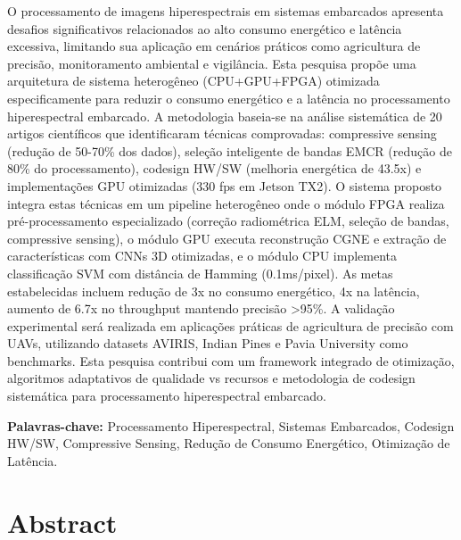 \documentclass[12pt,oneside,a4paper,english,brazilian]{report}
\begin{document}
O processamento de imagens hiperespectrais em sistemas embarcados apresenta desafios significativos relacionados ao alto consumo energético e latência excessiva, limitando sua aplicação em cenários práticos como agricultura de precisão, monitoramento ambiental e vigilância. Esta pesquisa propõe uma arquitetura de sistema heterogêneo (CPU+GPU+FPGA) otimizada especificamente para reduzir o consumo energético e a latência no processamento hiperespectral embarcado. A metodologia baseia-se na análise sistemática de 20 artigos científicos que identificaram técnicas comprovadas: compressive sensing (redução de 50-70\% dos dados), seleção inteligente de bandas EMCR (redução de 80\% do processamento), codesign HW/SW (melhoria energética de 43.5x) e implementações GPU otimizadas (330 fps em Jetson TX2). O sistema proposto integra estas técnicas em um pipeline heterogêneo onde o módulo FPGA realiza pré-processamento especializado (correção radiométrica ELM, seleção de bandas, compressive sensing), o módulo GPU executa reconstrução CGNE e extração de características com CNNs 3D otimizadas, e o módulo CPU implementa classificação SVM com distância de Hamming (0.1ms/pixel). As metas estabelecidas incluem redução de 3x no consumo energético, 4x na latência, aumento de 6.7x no throughput mantendo precisão >95\%. A validação experimental será realizada em aplicações práticas de agricultura de precisão com UAVs, utilizando datasets AVIRIS, Indian Pines e Pavia University como benchmarks. Esta pesquisa contribui com um framework integrado de otimização, algoritmos adaptativos de qualidade vs recursos e metodologia de codesign sistemática para processamento hiperespectral embarcado.

\textbf{Palavras-chave:} Processamento Hiperespectral, Sistemas Embarcados, Codesign HW/SW, Compressive Sensing, Redução de Consumo Energético, Otimização de Latência.

\newpage
\chapter*{Abstract}
\end{document}
